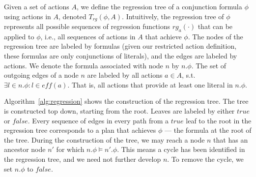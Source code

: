 \documentclass[letterpaper]{article}
\newcommand{\eff}{\textit{eff}}
\theoremstyle{definition}
\begin{document}
Given a set of actions $A$, we define the regression tree of a conjunction formula $\phi$ using actions in $A$, denoted $T_{rg}(\phi, A)$. 
Intuitively, the regression tree of $\phi$ represents all possible 
sequences of regression functions $rg_a(\cdot)$ that can be applied to $\phi$, i.e., all sequences of actions in $A$ that achieve $\phi$. 
The nodes of the regression tree are labeled by formulas (given our restricted action definition, these formulas are only conjunctions of literals), and the edges are labeled by actions. We denote the formula associated with node $n$ by $n.\phi$. The set of outgoing edges of a node $n$ are labeled by all actions $a \in A$, s.t. $\exists l \in n.\phi : l \in \eff(a)$. That is, all actions that provide at least one literal in $n.\phi$. 

Algorithm~\ref{alg:regression} shows the construction of the regression tree. The tree is constructed top down, starting from the root. Leaves are labeled by either $true$ or $false$. Every sequence of edges in every path from a $true$ leaf to the root in the regression tree corresponds to a plan that achieves $\phi$ --- the formula at the root of the tree. During the construction of the tree, 
we may reach a node $n$ 
that has an ancestor node $n'$ for which $n.\phi \models n'.\phi$. 
This means a cycle has been identified in the regression tree, and we need not further develop $n$. To remove the cycle, we set $n.\phi$ to $false$. 
\end{document}
